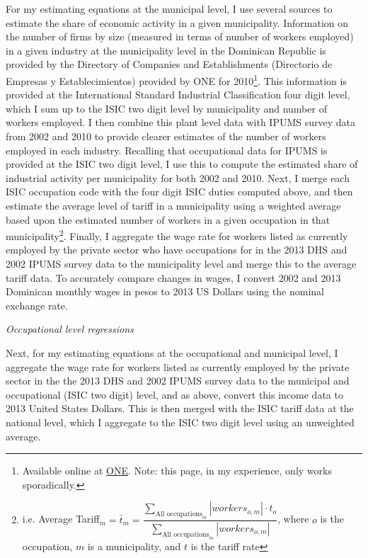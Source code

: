 \documentclass[12pt]{article}
\begin{document}
For my estimating equations at the municipal level,
I use several sources to estimate the share of economic activity in a given municipality.
Information on the number of firms by size (measured in terms of
number of workers employed) in a given industry at the 
municipality level in the Dominican Republic is provided by the 
Directory of Companies and Establishments (Directorio de Empresas y Establecimientos)
provided by ONE for 2010\footnote{Available online at \href{http://www.one.gov.do/recursos-automatizados/
323/directorio-de-empresas-y-establecimientos/}{ONE}. Note: this page, in my experience,
only works sporadically.}. This information is provided
at the International Standard Industrial Classification four digit level, which I sum
up to the ISIC two digit level by municipality and number of workers employed.
I then combine this plant level data with IPUMS survey data from 2002 and 2010 to provide 
clearer estimates of the number of workers employed in each industry. Recalling that occupational data
for IPUMS is provided at the ISIC two digit level, I use this to compute the estimated
share of industrial activity per municipality for both 2002 and 2010.
Next, I merge each ISIC occupation code with the four digit ISIC duties computed above, 
and then estimate the average level of tariff in a municipality using a weighted average
based upon the estimated number of workers in a given occupation in that 
municipality\footnote{i.e. Average Tariff$_m = \bar{t}_m =
\dfrac{\displaystyle \sum_{\text{All occupations}_m} |workers_{o,m}| \cdot t_o}
{\displaystyle \sum_{\text{All occupations}_m} |workers_{o,m}|}$, where $o$ is the 
occupation, $m$ is a municipality, and $t$ is the tariff rate}. Finally, I aggregate
the wage rate for workers listed as currently employed by the private sector who 
have occupations for in the 2013 DHS 
and 2002 IPUMS survey data to the municipality level and merge
this to the average tariff data. 
To accurately compare changes in wages, I convert 2002 
and 2013 Dominican monthly wages in pesos to 2013 US Dollars using the nominal exchange rate.

\textit{Occupational level regressions}

Next, for my estimating equations at the occupational 
and municipal level, I aggregate the wage rate for workers listed as currently employed 
by the private sector in the the 2013 DHS and 2002 IPUMS survey data to the 
municipal and occupational (ISIC two digit) level, and as above, 
convert this income data to 2013 United States Dollars. 
This is then merged with the ISIC tariff data at the national level, 
which I aggregate to the ISIC two digit level using an unweighted average. 
\end{document}
